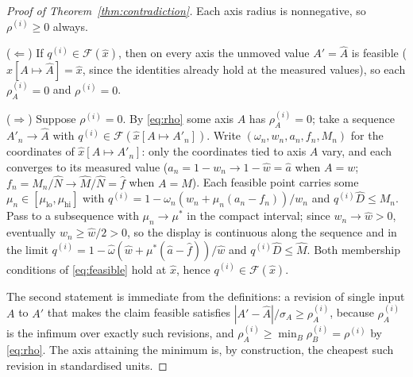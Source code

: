 \begin{proof}[Proof of Theorem~\ref{thm:contradiction}]
Each axis radius is nonnegative, so $\rho^{(i)}\ge 0$ always.

($\Leftarrow$) If $q^{(i)}\in\mathcal F(\hat x)$, then on every axis the unmoved value $A'=\hat A$ is feasible ($\hat x[A\mapsto\hat A]=\hat x$, since the identities already hold at the measured values), so each $\rho_A^{(i)}=0$ and $\rho^{(i)}=0$.

($\Rightarrow$) Suppose $\rho^{(i)}=0$. By \eqref{eq:rho} some axis $A$ has $\rho_A^{(i)}=0$; take a sequence $A'_n\to\hat A$ with $q^{(i)}\in\mathcal F(\hat x[A\mapsto A'_n])$. Write $(\omega_n,w_n,a_n,f_n,M_n)$ for the coordinates of $\hat x[A\mapsto A'_n]$: only the coordinates tied to axis $A$ vary, and each converges to its measured value ($a_n=1-w_n\to 1-\hat w=\hat a$ when $A=w$; $f_n=M_n/\hat N\to\hat M/\hat N=\hat f$ when $A=M$). Each feasible point carries some $\mu_n\in[\mu_{\mathrm{lo}},\mu_{\mathrm{hi}}]$ with $q^{(i)}=1-\omega_n(w_n+\mu_n(a_n-f_n))/w_n$ and $q^{(i)}\hat D\le M_n$. Pass to a subsequence with $\mu_n\to\mu^\ast$ in the compact interval; since $w_n\to\hat w>0$, eventually $w_n\ge\hat w/2>0$, so the display is continuous along the sequence and in the limit $q^{(i)}=1-\hat\omega(\hat w+\mu^\ast(\hat a-\hat f))/\hat w$ and $q^{(i)}\hat D\le\hat M$. Both membership conditions of \eqref{eq:feasible} hold at $\hat x$, hence $q^{(i)}\in\mathcal F(\hat x)$.

The second statement is immediate from the definitions: a revision of single input $A$ to $A'$ that makes the claim feasible satisfies $|A'-\hat A|/\sigma_A\ge\rho_A^{(i)}$, because $\rho_A^{(i)}$ is the infimum over exactly such revisions, and $\rho_A^{(i)}\ge\min_B\rho_B^{(i)}=\rho^{(i)}$ by \eqref{eq:rho}. The axis attaining the minimum is, by construction, the cheapest such revision in standardised units.
\end{proof}

